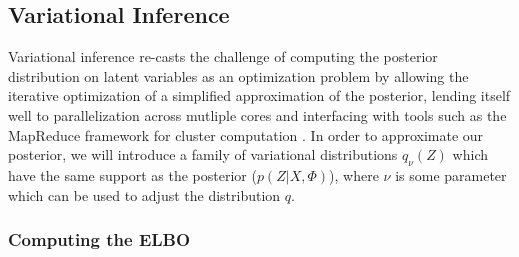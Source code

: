 \documentclass[12pt,letterpaper]{article}
\begin{document}
\subsection{Variational Inference}
Variational inference re-casts the challenge of computing the posterior distribution on latent variables as an optimization problem by allowing the iterative optimization of a simplified approximation of the posterior, lending itself well to parallelization across mutliple cores and interfacing with tools such as the MapReduce framework for cluster computation \citep{zhai:2012}. In order to approximate our posterior, we will introduce a family of variational distributions $q_{\nu}(Z)$ which have the same support as the posterior ($p(Z|X, \Phi)$), where $\nu$ is some parameter which can be used to adjust the distribution $q$. 

\subsubsection{Computing the ELBO}
\end{document}
